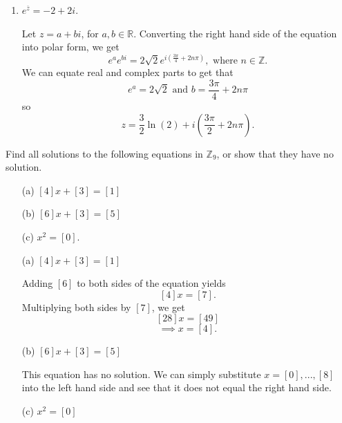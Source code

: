 \documentclass{article}
\newcommand{\cl}[1]{\overline{#1}}
\theoremstyle{plain} %
\numberwithin{thm}{section} %
\theoremstyle{definition}
\begin{document}
\begin{question}{1}
\begin{enumerate}
            \item \(e^{\cl{z}} = -2 + 2i\).
            
            Let \(z = a + bi\), for \(a,b \in \mathbb{R}\). Converting the right hand side of the equation into polar form, we get
            \[
                e^a e^{bi} = 2\sqrt{2} e^{i \left(\frac{3\pi} {4} + 2n \pi \right)}, \text{ where } n \in \mathbb{Z}.
            \]
            We can equate real and complex parts to get that
            \[
                e^a = 2\sqrt{2} \text{ and } b = \frac{3\pi}{4} + 2n \pi
            \]
            so
            \[
                z = \frac{3}{2}\ln (2) + i\left( \frac{3\pi}{2} + 2n \pi\right).
            \]
        \end{enumerate}
    \end{question}
    \newpage
    \begin{question}{2}
        Find all solutions to the following equations in \( \mathbb{Z}_9 \), or show that they have no solution.

        \begin{enumerate}
            \item[(a)] \([4]x + [3] = [1]\)
            \item[(b)] \([6]x + [3] = [5]\)
            \item[(c)] \(x^2 = [0]\).
        \end{enumerate}
        \tcblower
        \begin{enumerate}
            \item[(a)] \([4]x + [3] = [1]\)
            
            Adding \([6]\) to both sides of the equation yields
            \[
                [4]x = [7].
            \]
            Multiplying both sides by \([7]\), we get
            \[
                [28]x = [49]
            \]
            \[
                \implies x = [4].
            \]
            
            \item[(b)] \([6]x + [3] = [5]\)
            
            This equation has no solution. We can simply substitute \(x = [0], ..., [8]\) into the left hand side and see that it does not equal the right hand side.

            \item[(c)] \(x^2 = [0]\)
            


        \end{enumerate}
    \end{question}
\end{document}

